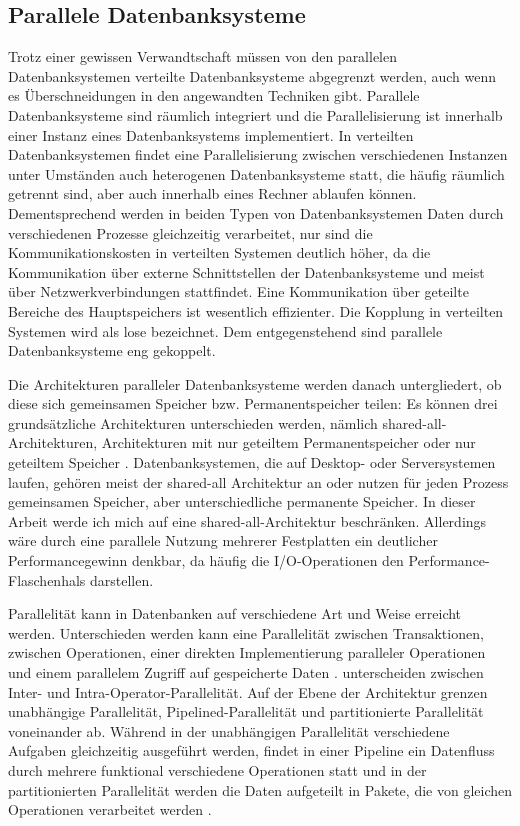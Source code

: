 \documentclass[a4paper,12pt,twoside]{article}
\begin{document}
\subsection{Parallele Datenbanksysteme}
\label{P_DBS} 

Trotz einer gewissen Verwandtschaft müssen von den parallelen Datenbanksystemen verteilte Datenbanksysteme abgegrenzt werden, auch wenn es Überschneidungen in den angewandten Techniken gibt. Parallele Datenbanksysteme sind räumlich integriert und die Parallelisierung ist innerhalb einer Instanz eines Datenbanksystems implementiert. In verteilten Datenbanksystemen findet eine Parallelisierung zwischen verschiedenen Instanzen unter Umständen auch heterogenen Datenbanksysteme statt, die häufig räumlich getrennt sind, aber auch innerhalb eines Rechner ablaufen können. Dementsprechend werden in beiden Typen von Datenbanksystemen Daten durch verschiedenen Prozesse gleichzeitig verarbeitet, nur sind die Kommunikationskosten in verteilten Systemen deutlich höher, da die Kommunikation über externe Schnittstellen der Datenbanksysteme und meist über Netzwerkverbindungen stattfindet. Eine Kommunikation über geteilte Bereiche des Hauptspeichers ist wesentlich effizienter. Die Kopplung in verteilten Systemen wird als lose bezeichnet. Dem entgegenstehend sind parallele Datenbanksysteme eng gekoppelt.

Die Architekturen paralleler Datenbanksysteme werden danach untergliedert, ob diese sich gemeinsamen Speicher bzw. Permanentspeicher teilen: Es können drei grundsätzliche Architekturen unterschieden werden, nämlich shared-all-Architekturen, Architekturen mit nur geteiltem Permanentspeicher oder nur geteiltem Speicher \parencite{Yu1998}. Datenbanksystemen, die auf Desktop- oder Serversystemen laufen, gehören meist der shared-all Architektur an oder nutzen für jeden Prozess gemeinsamen Speicher, aber unterschiedliche permanente Speicher. In dieser Arbeit werde ich mich auf eine shared-all-Architektur beschränken. Allerdings wäre durch eine parallele Nutzung mehrerer Festplatten ein deutlicher Performancegewinn denkbar, da häufig die I/O-Operationen den Performance-Flaschenhals darstellen.

Parallelität kann in Datenbanken auf verschiedene Art und Weise erreicht werden. Unterschieden werden kann eine Parallelität zwischen Transaktionen, zwischen Operationen, einer direkten Implementierung paralleler Operationen und einem parallelem Zugriff auf gespeicherte Daten \parencite{Reuter1999}. \textcite [S. 1]{Yu1998} unterscheiden zwischen Inter- und Intra-Operator-Parallelität. Auf der Ebene der Architektur grenzen \textcite{Yu1998} unabhängige Parallelität, Pipelined-Parallelität und partitionierte Parallelität voneinander ab. Während in der unabhängigen Parallelität verschiedene Aufgaben gleichzeitig ausgeführt werden, findet in einer Pipeline ein Datenfluss durch mehrere funktional verschiedene Operationen statt und in der partitionierten Parallelität werden die Daten aufgeteilt in Pakete, die von gleichen Operationen verarbeitet werden \parencite{DeWitt1992}.
\end{document}

